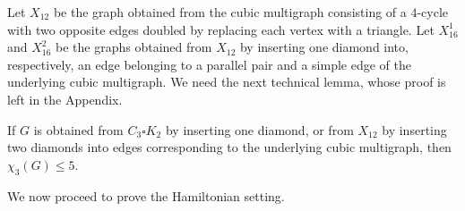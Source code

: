 Let $X_{12}$ be the graph obtained from the cubic multigraph consisting
of a $4$-cycle with two opposite edges doubled by replacing each
vertex with a triangle. Let $X_{16}^1$ and $X_{16}^2$ be the graphs
obtained from $X_{12}$ by inserting one diamond into, respectively,
an edge belonging to a parallel pair and a simple edge of the
underlying cubic multigraph.
We need the next technical lemma, whose proof is left in the Appendix.

\begin{lemma}\label{lem:small-diamond-insertions}
If $G$ is obtained from $C_3\square K_2$ by inserting one diamond, or
from $X_{12}$ by inserting two diamonds into edges corresponding to the
underlying cubic multigraph, then
$
\chi_3(G)\leq5.
$
\end{lemma}

We now proceed to prove the Hamiltonian setting.

